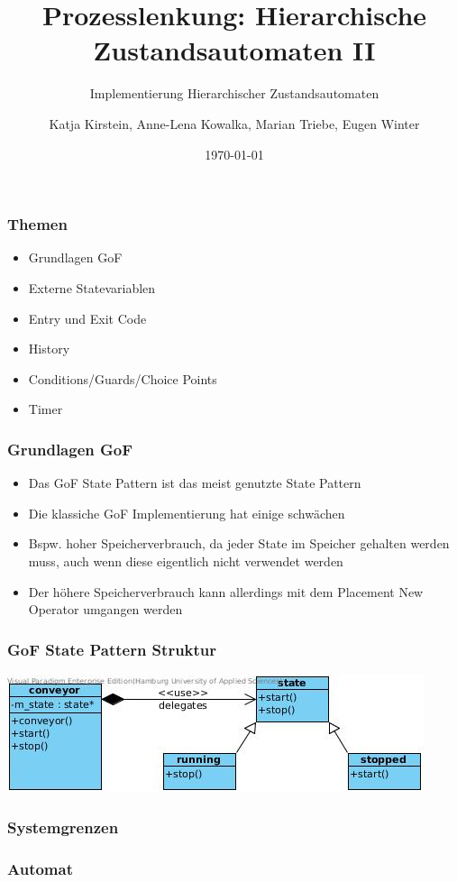 \documentclass{beamer}
\title{Prozesslenkung: Hierarchische Zustandsautomaten II}
\subtitle{Implementierung Hierarchischer Zustandsautomaten}
\author{Katja Kirstein, Anne-Lena Kowalka, Marian Triebe, Eugen Winter}
\date{\today}
\begin{document}
\begin{frame}
\titlepage
\end{frame}

\begin{frame}
 \frametitle{Themen}
 \begin{itemize}
  \item Grundlagen GoF
  \item Externe Statevariablen
  \item Entry und Exit Code
  \item History
  \item Conditions/Guards/Choice Points
  \item Timer
 \end{itemize}
\end{frame}

\begin{frame}
 \frametitle{Grundlagen GoF}
 \begin{itemize}
  \item Das GoF State Pattern ist das meist genutzte State Pattern
  \item Die klassiche GoF Implementierung hat einige schw\"achen
  \item Bspw. hoher Speicherverbrauch, da jeder State im Speicher gehalten werden muss, auch wenn diese eigentlich nicht verwendet werden
  \item Der h\"ohere Speicherverbrauch kann allerdings mit dem Placement New Operator umgangen werden
 \end{itemize}
\end{frame}

\begin{frame}
 \frametitle{GoF State Pattern Struktur}
 \includegraphics[scale=.6]{img/fsm_gof.jpg}
\end{frame}

\begin{frame}
 \frametitle{Systemgrenzen}
\end{frame}

\begin{frame}
 \frametitle{Automat}
\end{frame}
\end{document}
